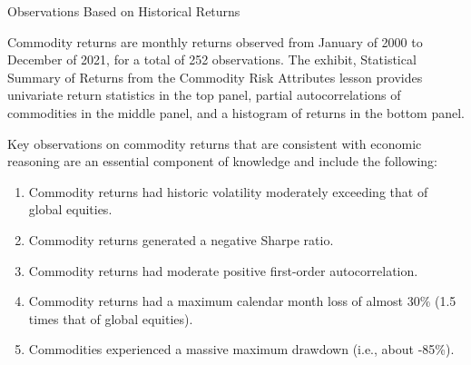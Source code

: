 \documentclass[11pt]{article}
\begin{document}
Observations Based on Historical Returns

Commodity returns are monthly returns observed from January of 2000 to December of 2021, for a total of 252 observations. The exhibit, Statistical Summary of Returns from the Commodity Risk Attributes lesson provides univariate return statistics in the top panel, partial autocorrelations of commodities in the middle panel, and a histogram of returns in the bottom panel.

Key observations on commodity returns that are consistent with economic reasoning are an essential component of knowledge and include the following:

\begin{enumerate}
  \item Commodity returns had historic volatility moderately exceeding that of global equities.

  \item Commodity returns generated a negative Sharpe ratio.

  \item Commodity returns had moderate positive first-order autocorrelation.

  \item Commodity returns had a maximum calendar month loss of almost $30 \%$ (1.5 times that of global equities).

  \item Commodities experienced a massive maximum drawdown (i.e., about -85\%).

\end{enumerate}
\end{document}
